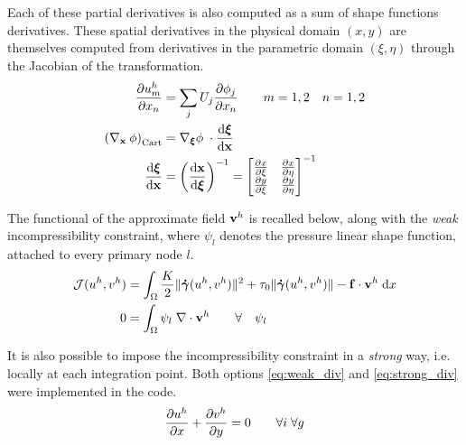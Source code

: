 \documentclass[11 pt]{report}
\begin{document}
Each of these partial derivatives is also computed as a sum of shape functions derivatives. These spatial derivatives in the physical domain $(x,y)$ are themselves computed from derivatives in the parametric domain $(\xi, \eta)$ through the Jacobian of the transformation.
\begin{align}
    \pdv{u^h_m}{x_n} &= \sum_j U_j \pdv{\phi_j}{x_n} \qquad m=1,2 \quad n=1,2\\
    \left(\nabla_{\mathbf{x}} \: \phi\right)_{\text{Cart}} &= \nabla_{\boldsymbol\xi} \phi \; \cdot \dv{\boldsymbol \xi}{\mathbf{x}}\\
    \dv{\boldsymbol \xi}{\mathbf{x}} &= \left(\dv{\mathbf{x}}{\boldsymbol \xi}\right)^{-1} = 
    \begin{bmatrix}
        \pdv{x}{\xi} & \pdv{x}{\eta}\\
        \pdv{y}{\xi} & \pdv{y}{\eta}\\
    \end{bmatrix}^{-1}
\end{align}

The functional of the approximate field $\mathbf{v}^h$ is recalled below, along with the \textit{weak} incompressibility constraint, where $\psi_l$ denotes the pressure linear shape function, attached to every primary node $l$.
\begin{align}
    \mathcal{J}(u^h, v^h) &= \int_{\Omega} \frac{K}{2} \|\boldsymbol{\dot \gamma}(u^h, v^h)\|^2 + \tau_0 \|\boldsymbol{\dot \gamma}(u^h, v^h)\| - \mathbf{f} \cdot \mathbf{v}^h \; \dd x\\
    0 &= \int_{\Omega} \psi_l \; \nabla \cdot \mathbf{v}^h \qquad \forall \quad \psi_l \label{eq:strong_div}
\end{align}

It is also possible to impose the incompressibility constraint in a \textit{strong} way, i.e. locally at each integration point\cite{Bleyer}. Both options \eqref{eq:weak_div} and \eqref{eq:strong_div} were implemented in the code.
\begin{equation}
    \pdv{u^h}{x} + \pdv{v^h}{y} = 0 \qquad \forall i \; \forall g \label{eq:weak_div}
\end{equation}
\end{document}
